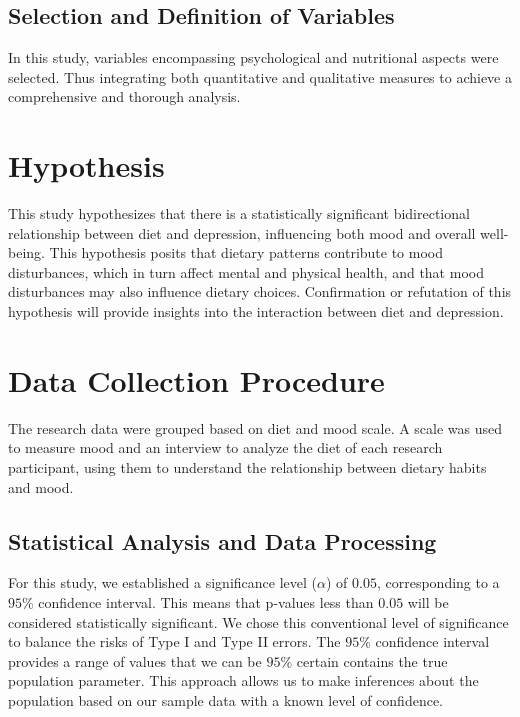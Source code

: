 \documentclass[jou]{apa7}
\begin{document}
\subsection{Selection and Definition of Variables}\label{selecciuxf3n-y-definiciuxf3n-de-variables}

In this study, variables encompassing psychological and nutritional aspects were selected. Thus integrating both quantitative and qualitative measures to achieve a comprehensive and thorough analysis.


\section{Hypothesis}\label{hipuxf3tesis}

This study hypothesizes that there is a statistically significant bidirectional relationship between diet and depression, influencing both mood and overall well-being. This hypothesis posits that dietary patterns contribute to mood disturbances, which in turn affect mental and physical health, and that mood disturbances may also influence dietary choices. Confirmation or refutation of this hypothesis will provide insights into the interaction between diet and depression.

\section{Data Collection Procedure}\label{procedimiento-para-recolecciuxf3n-de-datos}

The research data were grouped based on diet and mood scale. A scale was used to measure mood and an interview to analyze the diet of each research participant, using them to understand the relationship between dietary habits and mood.


\subsection{Statistical Analysis and Data Processing}

For this study, we established a significance level ($\alpha$) of $0.05$, corresponding to a $95\%$ confidence interval. This means that p-values less than $0.05$ will be considered statistically significant. We chose this conventional level of significance to balance the risks of Type I and Type II errors. The $95\%$ confidence interval provides a range of values that we can be $95\%$ certain contains the true population parameter. This approach allows us to make inferences about the population based on our sample data with a known level of confidence.
\end{document}
